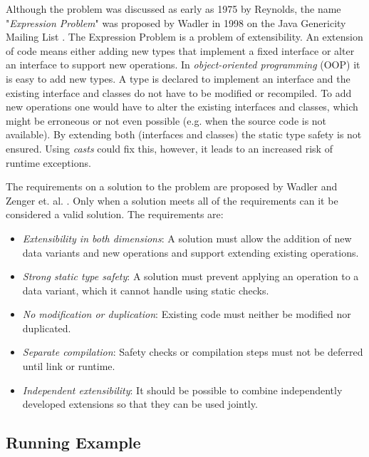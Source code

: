 \documentclass{report}
\begin{document}
Although the problem was discussed as early as 1975 by Reynolds, the name "\emph{Expression Problem}" was proposed by Wadler in 1998 on the Java Genericity Mailing List \cite{Reynolds-Abstraction-1975, Wadler-Expression-1998}. The Expression Problem is a problem of extensibility. An extension of code means either adding new types that implement a fixed interface or alter an interface to support new operations. In \emph{object-oriented programming} (OOP) it is easy to add new types. A type is declared to implement an interface and the existing interface and classes do not have to be modified or recompiled. To add new operations one would have to alter the existing interfaces and classes, which might be erroneous or not even possible (e.g. when the source code is not available). By extending both (interfaces and classes) the static type safety is not ensured. Using \emph{casts} could fix this, however, it leads to an increased risk of runtime exceptions.

The requirements on a solution to the problem are proposed by Wadler and Zenger et. al. \cite{Wadler-Expression-1998, Odersky-Expression-2005, Oliv-Extensibility-2012}. Only when a solution meets all of the requirements can it be considered a valid solution. The requirements are:

\begin{itemize}
  \item \emph{Extensibility in both dimensions}: A solution must allow the addition of new data variants and new operations and support extending existing operations.
  \item \emph{Strong static type safety}: A solution must prevent applying an operation to a data variant, which it cannot handle using static checks.
  \item \emph{No modification or duplication}: Existing code must neither be modified nor duplicated.
  \item \emph{Separate compilation}: Safety checks or compilation steps must not be deferred until link or runtime.
  \item \emph{Independent extensibility}: It should be possible to combine independently developed extensions so that they can be used jointly.
\end{itemize}


\subsection{Running Example}
\label{example}
\end{document}
